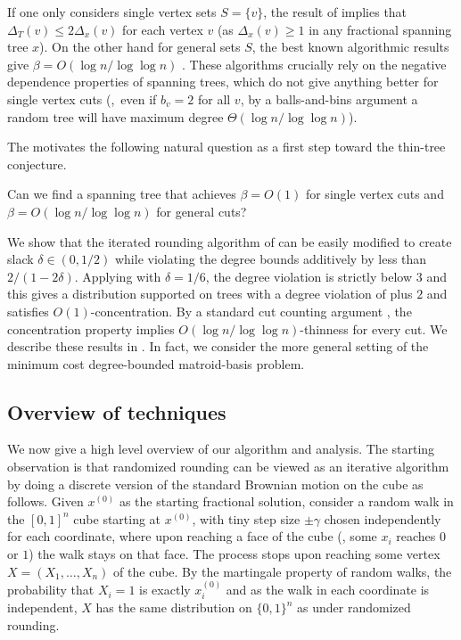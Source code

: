 \documentclass{toc}
\begin{document}
If one only considers single vertex sets $S = \{v\}$, 
the result of \cite{SL07} implies that $\Delta_T(v) \leq 2 \Delta_x(v)$ for each vertex $v$ (as $\Delta_x(v) \geq 1$ in any fractional spanning tree $x$). 
On the other hand for general sets $S$, the best known algorithmic results give $\beta=O(\log n /\log \log n)$ \cite{AGMOS10,CVZ10,SV14,HO14}.
These algorithms crucially rely on the negative dependence properties of spanning trees, which do not give anything better for single vertex cuts
(\eg,~even if $b_v=2$ for all $v$, by a balls-and-bins argument a random tree will have maximum degree $\Theta(\log n/\log \log n)$).

The motivates the following natural question as a first step toward the thin-tree conjecture.
\begin{question}
Can we find a spanning tree that achieves $\beta=O(1)$ for single vertex cuts and $\beta=O(\log n/\log \log n)$ for general cuts?
\end{question} 

%
%
%

 We show that the iterated rounding algorithm of \cite{SL07} can be easily modified to create slack $\delta \in (0,1/2)$ while violating the degree bounds additively by less than $2/(1-2\delta)$. Applying  with $\delta = 1/6$, the degree violation is strictly below $3$ and this gives a distribution supported on trees with a degree violation of plus $2$ and satisfies $O(1)$-concentration. By a standard cut counting argument \cite{AGMOS10}, the concentration property implies $O(\log n/\log \log n)$-thinness for every cut.
We describe these results in . In fact, we consider the more general
setting of the minimum cost degree-bounded matroid-basis problem.

%
%
%
%
%
%
%
%

%

%
%
%

%
%

%
%


\subsection{Overview of techniques}
We now give a high level overview of our algorithm and  analysis.
The starting observation is that randomized rounding can be viewed as an iterative algorithm by doing a discrete version of the standard Brownian motion on the cube as follows.
Given $x^{(0)}$ as the starting fractional solution, consider a random walk in the $[0,1]^n$ cube starting at $x^{(0)}$, with tiny step size $\pm \gamma$ chosen independently for each coordinate, where upon reaching a face of the cube (\ie, some $x_i$ reaches $0$ or $1$) the walk stays on that face.
The process stops upon reaching some vertex $X=(X_1,\ldots,X_n)$ of the cube. By the martingale property of random walks, the probability
that $X_i=1$ is exactly $x_i^{(0)}$ and as the  walk in each coordinate is independent, $X$ has the same distribution on $\{0,1\}^n$ as under randomized rounding.
\end{document}
